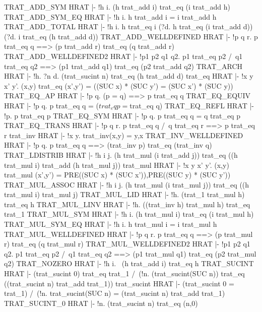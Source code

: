 \ENDTHEOREM
\THEOREM TRAT\_ADD\_SYM HRAT
|- !h i. (h trat_add i) trat_eq (i trat_add h)
\ENDTHEOREM
\THEOREM TRAT\_ADD\_SYM\_EQ HRAT
|- !h i. h trat_add i = i trat_add h
\ENDTHEOREM
\THEOREM TRAT\_ADD\_TOTAL HRAT
|- !h i.
    h trat_eq i \/
    (?d. h trat_eq (i trat_add d)) \/
    (?d. i trat_eq (h trat_add d))
\ENDTHEOREM
\THEOREM TRAT\_ADD\_WELLDEFINED HRAT
|- !p q r. p trat_eq q ==> (p trat_add r) trat_eq (q trat_add r)
\ENDTHEOREM
\THEOREM TRAT\_ADD\_WELLDEFINED2 HRAT
|- !p1 p2 q1 q2.
    p1 trat_eq p2 /\ q1 trat_eq q2 ==>
    (p1 trat_add q1) trat_eq (p2 trat_add q2)
\ENDTHEOREM
\THEOREM TRAT\_ARCH HRAT
|- !h. ?n d. (trat_sucint n) trat_eq (h trat_add d)
\ENDTHEOREM
\THEOREM trat\_eq HRAT
|- !x y x' y'.
    (x,y) trat_eq (x',y') = ((SUC x) * (SUC y') = (SUC x') * (SUC y))
\ENDTHEOREM
\THEOREM TRAT\_EQ\_AP HRAT
|- !p q. (p = q) ==> p trat_eq q
\ENDTHEOREM
\THEOREM TRAT\_EQ\_EQUIV HRAT
|- !p q. p trat_eq q = ($trat_eq p = $trat_eq q)
\ENDTHEOREM
\THEOREM TRAT\_EQ\_REFL HRAT
|- !p. p trat_eq p
\ENDTHEOREM
\THEOREM TRAT\_EQ\_SYM HRAT
|- !p q. p trat_eq q = q trat_eq p
\ENDTHEOREM
\THEOREM TRAT\_EQ\_TRANS HRAT
|- !p q r. p trat_eq q /\ q trat_eq r ==> p trat_eq r
\ENDTHEOREM
\THEOREM trat\_inv HRAT
|- !x y. trat_inv(x,y) = y,x
\ENDTHEOREM
\THEOREM TRAT\_INV\_WELLDEFINED HRAT
|- !p q. p trat_eq q ==> (trat_inv p) trat_eq (trat_inv q)
\ENDTHEOREM
\THEOREM TRAT\_LDISTRIB HRAT
|- !h i j.
    (h trat_mul (i trat_add j)) trat_eq
    ((h trat_mul i) trat_add (h trat_mul j))
\ENDTHEOREM
\THEOREM trat\_mul HRAT
|- !x y x' y'.
    (x,y) trat_mul (x',y') =
    PRE((SUC x) * (SUC x')),PRE((SUC y) * (SUC y'))
\ENDTHEOREM
\THEOREM TRAT\_MUL\_ASSOC HRAT
|- !h i j.
    (h trat_mul (i trat_mul j)) trat_eq ((h trat_mul i) trat_mul j)
\ENDTHEOREM
\THEOREM TRAT\_MUL\_LID HRAT
|- !h. (trat_1 trat_mul h) trat_eq h
\ENDTHEOREM
\THEOREM TRAT\_MUL\_LINV HRAT
|- !h. ((trat_inv h) trat_mul h) trat_eq trat_1
\ENDTHEOREM
\THEOREM TRAT\_MUL\_SYM HRAT
|- !h i. (h trat_mul i) trat_eq (i trat_mul h)
\ENDTHEOREM
\THEOREM TRAT\_MUL\_SYM\_EQ HRAT
|- !h i. h trat_mul i = i trat_mul h
\ENDTHEOREM
\THEOREM TRAT\_MUL\_WELLDEFINED HRAT
|- !p q r. p trat_eq q ==> (p trat_mul r) trat_eq (q trat_mul r)
\ENDTHEOREM
\THEOREM TRAT\_MUL\_WELLDEFINED2 HRAT
|- !p1 p2 q1 q2.
    p1 trat_eq p2 /\ q1 trat_eq q2 ==>
    (p1 trat_mul q1) trat_eq (p2 trat_mul q2)
\ENDTHEOREM
\THEOREM TRAT\_NOZERO HRAT
|- !h i. ~(h trat_add i) trat_eq h
\ENDTHEOREM
\THEOREM TRAT\_SUCINT HRAT
|- (trat_sucint 0) trat_eq trat_1 /\
   (!n. (trat_sucint(SUC n)) trat_eq ((trat_sucint n) trat_add trat_1))
\ENDTHEOREM
\THEOREM trat\_sucint HRAT
|- (trat_sucint 0 = trat_1) /\
   (!n. trat_sucint(SUC n) = (trat_sucint n) trat_add trat_1)
\ENDTHEOREM
\THEOREM TRAT\_SUCINT\_0 HRAT
|- !n. (trat_sucint n) trat_eq (n,0)
\ENDTHEOREM

